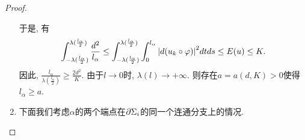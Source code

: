 \begin{proof}
\begin{claim}
\begin{subproof}
\begin{enumerate}
                于是, 有
                \begin{equation}
                    \int^{\lambda(\frac{l_\alpha}{2})}_{-\lambda(\frac{l_\alpha}{2})} \frac{d^2}{l_\alpha} \le \int^{\lambda(\frac{l_\alpha}{2})}_{-\lambda(\frac{l_\alpha}{2})} \int^{l_\alpha}_0 \abs{d(u_k\circ \phi)}^2 dtds \le E(u) \le K.
                \end{equation}
                因此, $\frac{l_\alpha}{\lambda(\frac{l_\alpha}{2})} \ge \frac{2d^2}{K}$.  由于$l\to 0$时, $\lambda(l) \to +\infty$. 则存在$a=a(d,K)>0$使得$l_\alpha \ge a$.
                \item 下面我们考虑$\alpha$的两个端点在$\P \Sigma_i$的同一个连通分支上的情况.
            \end{enumerate}
        \end{subproof}
    \end{claim}
\end{proof}